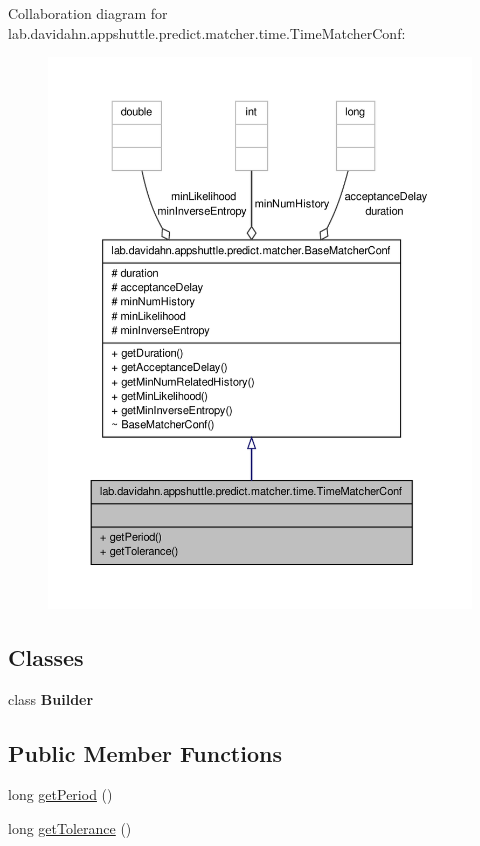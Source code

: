 \-Collaboration diagram for lab.\-davidahn.\-appshuttle.\-predict.\-matcher.\-time.\-Time\-Matcher\-Conf\-:
\nopagebreak
\begin{figure}[H]
\begin{center}
\leavevmode
\includegraphics[width=350pt]{classlab_1_1davidahn_1_1appshuttle_1_1predict_1_1matcher_1_1time_1_1_time_matcher_conf__coll__graph}
\end{center}
\end{figure}
\subsection*{\-Classes}
\begin{DoxyCompactItemize}
\item 
class {\bfseries \-Builder}
\end{DoxyCompactItemize}
\subsection*{\-Public \-Member \-Functions}
\begin{DoxyCompactItemize}
\item 
long \hyperlink{classlab_1_1davidahn_1_1appshuttle_1_1predict_1_1matcher_1_1time_1_1_time_matcher_conf_ab333afeecd5e1ea1513a8b138450f716}{get\-Period} ()
\item 
long \hyperlink{classlab_1_1davidahn_1_1appshuttle_1_1predict_1_1matcher_1_1time_1_1_time_matcher_conf_a77f5b5c7d8a704271755b10082dbf2d8}{get\-Tolerance} ()
\end{DoxyCompactItemize}


